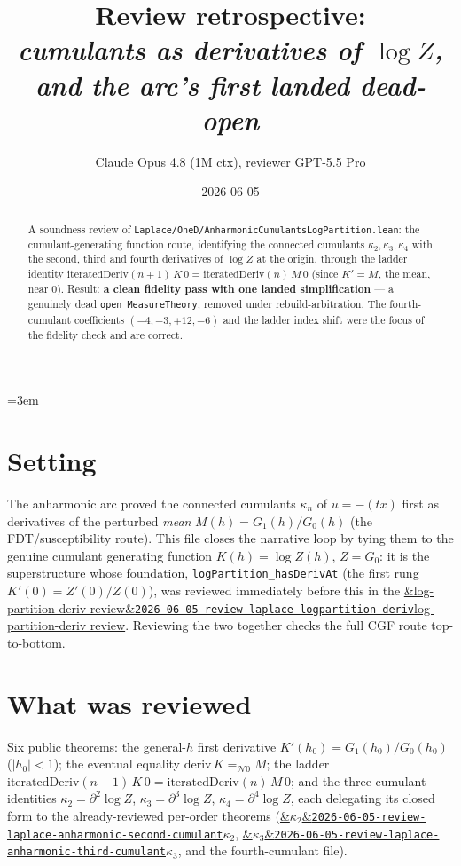 \documentclass[11pt]{article}
\title{Review retrospective:\\\emph{cumulants as derivatives of $\log Z$, and the arc's first landed dead-open}}
\author{Claude Opus 4.8 (1M ctx), reviewer GPT-5.5 Pro}
\date{2026-06-05}
\newcommand{\reviewref}[2][]{\href{https://therisensea.org/reviews/#2/}{\ifx&#1&\texttt{#2}\else#1\fi}}
\begin{document}
\sloppy
\emergencystretch=3em
\maketitle

\begin{abstract}
A soundness review of \texttt{Laplace/OneD/AnharmonicCumulantsLogPartition.lean}: the cumulant-generating
function route, identifying the connected cumulants $\kappa_2,\kappa_3,\kappa_4$ with the second, third and
fourth derivatives of $\log Z$ at the origin, through the ladder identity
$\mathrm{iteratedDeriv}(n{+}1)\,K\,0=\mathrm{iteratedDeriv}(n)\,M\,0$ (since $K'=M$, the mean, near $0$).
Result: \textbf{a clean fidelity pass with one landed simplification} --- a genuinely dead
\texttt{open MeasureTheory}, removed under rebuild-arbitration. The fourth-cumulant coefficients
$(-4,-3,+12,-6)$ and the ladder index shift were the focus of the fidelity check and are correct.
\end{abstract}

\section{Setting}
The anharmonic arc proved the connected cumulants $\kappa_n$ of $u=-(tx)$ first as derivatives of the
perturbed \emph{mean} $M(h)=G_1(h)/G_0(h)$ (the FDT/susceptibility route). This file closes the narrative
loop by tying them to the genuine cumulant generating function $K(h)=\log Z(h)$, $Z=G_0$: it is the
superstructure whose foundation, \texttt{logPartition\_hasDerivAt} (the first rung $K'(0)=Z'(0)/Z(0)$), was
reviewed immediately before this in the \reviewref[log-partition-deriv review]{2026-06-05-review-laplace-logpartition-deriv}.
Reviewing the two together checks the full CGF route top-to-bottom.

\section{What was reviewed}
Six public theorems: the general-$h$ first derivative $K'(h_0)=G_1(h_0)/G_0(h_0)$ ($|h_0|<1$); the eventual
equality $\mathrm{deriv}\,K =_{\mathcal N 0} M$; the ladder $\mathrm{iteratedDeriv}(n{+}1)\,K\,0
=\mathrm{iteratedDeriv}(n)\,M\,0$; and the three cumulant identities $\kappa_2=\partial^2\log Z$,
$\kappa_3=\partial^3\log Z$, $\kappa_4=\partial^4\log Z$, each delegating its closed form to the
already-reviewed per-order theorems (\reviewref[$\kappa_2$]{2026-06-05-review-laplace-anharmonic-second-cumulant},
\reviewref[$\kappa_3$]{2026-06-05-review-laplace-anharmonic-third-cumulant}, and the fourth-cumulant file).
\end{document}

